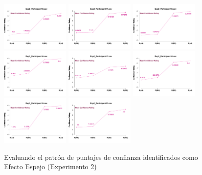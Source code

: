 \begin{figure}[th]
\includegraphics[width=0.30\textwidth]{Figures/MirrorRating_Exp2_P13} \includegraphics[width=0.30\textwidth]{Figures/MirrorRating_Exp2_P14} \includegraphics[width=0.30\textwidth]{Figures/MirrorRating_Exp2_P15}
\includegraphics[width=0.30\textwidth]{Figures/MirrorRating_Exp2_P16} \includegraphics[width=0.30\textwidth]{Figures/MirrorRating_Exp2_P17} \includegraphics[width=0.30\textwidth]{Figures/MirrorRating_Exp2_P18}
\includegraphics[width=0.30\textwidth]{Figures/MirrorRating_Exp2_P19} \includegraphics[width=0.30\textwidth]{Figures/MirrorRating_Exp2_P20} 
\caption[MERating_Exp2]{Evaluando el patrón de puntajes de confianza identificados como Efecto Espejo (Experimento 2)}
\label{fig:MERating_E2}
\end{figure}
